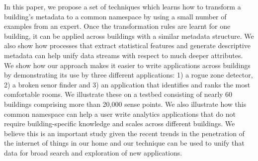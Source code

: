

In this paper, we propose a set of techniques which learns how to transform a 
building's metadata 
to a common namespace by using a small number of examples from an expert. Once the transformation 
rules are learnt for one building, it can be applied across buildings with a similar 
metadata structure.  We also show how processes that extract statistical features and generate
descriptive metadata can help unify data streams with respect to much deeper attributes.
We show how our approach makes it easier to write applications across buildings by
demonstrating its use by three different applications: 1) a rogue zone detector, 2)
a broken senor finder and 3) an application that identifies and ranks the most comfortable
rooms. We illustrate these on a testbed consisting of nearly 60 buildings comprising more 
than 20,000 sense points. We also illustrate how this common namespace can help a user write 
analytics applications that do not require building-specific knowledge and scales across 
different buildings.
We believe this is an important study given the recent trends in the penetration
of the internet of things in our home and our technique can be used to unify that data
for broad search and exploration of new applications.

